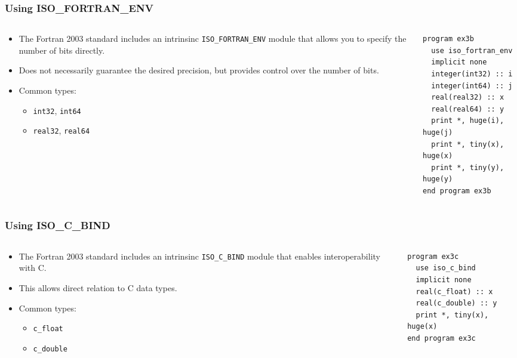 \begin{frame}[fragile]
  \frametitle{Using ISO\_FORTRAN\_ENV}
  \begin{columns}[T]
    \begin{column}{0.5\textwidth}
      \begin{itemize}
      \item The Fortran 2003 standard includes an intrinsinc \texttt{ISO\_FORTRAN\_ENV} module that allows you to specify the number of bits directly.
        \item Does not necessarily guarantee the desired precision, but provides control over the number of bits.
        \item Common types:
          \begin{itemize}
            \item \texttt{int32}, \texttt{int64}
            \item \texttt{real32}, \texttt{real64}
          \end{itemize}
      \end{itemize}
    \end{column}

    \begin{column}{0.5\textwidth}
      \begin{lstlisting}
program ex3b
  use iso_fortran_env
  implicit none
  integer(int32) :: i
  integer(int64) :: j
  real(real32) :: x
  real(real64) :: y
  print *, huge(i), huge(j)
  print *, tiny(x), huge(x)
  print *, tiny(y), huge(y)
end program ex3b
      \end{lstlisting}
    \end{column}
  \end{columns}
\end{frame}


\begin{frame}[fragile]
  \frametitle{Using ISO\_C\_BIND}
  \begin{columns}[T]
    \begin{column}{0.5\textwidth}
      \begin{itemize}
        \item The Fortran 2003 standard includes an intrinsinc \texttt{ISO\_C\_BIND} module that enables interoperability with C.
        \item This allows direct relation to C data types.
        \item Common types:
          \begin{itemize}
            \item \texttt{c\_float}
            \item \texttt{c\_double}
          \end{itemize}
      \end{itemize}
    \end{column}

    \begin{column}{0.5\textwidth}
      \begin{lstlisting}
program ex3c
  use iso_c_bind
  implicit none
  real(c_float) :: x
  real(c_double) :: y
  print *, tiny(x), huge(x)
end program ex3c
      \end{lstlisting}
    \end{column}
  \end{columns}
\end{frame}
